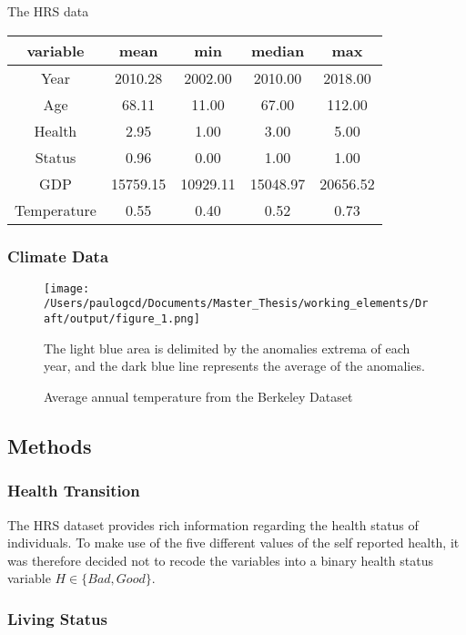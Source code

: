 \documentclass{article}
\begin{document}
The HRS data 

\begin{tabular}{ccccc}
    \toprule
    variable & mean & min & median & max\\
    \midrule
    Year & 2010.28 & 2002.00 & 2010.00 & 2018.00\\
    Age & 68.11 & 11.00 & 67.00 & 112.00\\
    Health & 2.95 & 1.00 & 3.00 & 5.00\\
    Status & 0.96 & 0.00 & 1.00 & 1.00\\
    GDP & 15759.15 & 10929.11 & 15048.97 & 20656.52\\
    Temperature & 0.55 & 0.40 & 0.52 & 0.73\\
    \bottomrule
\end{tabular}
    

\subsubsection{Climate Data}

\begin{figure}[h]
    \texttt{[image: /Users/paulogcd/Documents/Master\_Thesis/working\_elements/Draft/output/figure\_1.png]}
    \caption{Average annual temperature from the Berkeley Dataset}
    
    The light blue area is delimited by the anomalies extrema of each year, and
    the dark blue line represents the average of the anomalies.
\end{figure}

\subsection{Methods}

\subsubsection{Health Transition}

The HRS dataset provides rich information regarding the health status of individuals. 
To make use of the five different values of the self reported health, it was therefore decided not to
recode the variables into a binary health status variable $H\in\{Bad, Good\}$. 

\subsubsection{Living Status}
\end{document}
